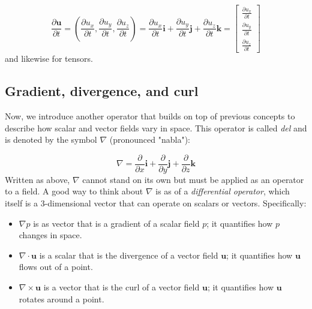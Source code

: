 \documentclass[12pt]{article}
\numberwithin{equation}{section}
\numberwithin{figure}{section}
\numberwithin{table}{section}
\begin{document}
\begin{equation}
  \frac{\partial \mathbf{u}}{\partial t}
    = \left(\frac{\partial u_x}{\partial t}, \frac{\partial u_y}{\partial t}, \frac{\partial u_z}{\partial t}\right)
    = \frac{\partial u_x}{\partial t} \mathbf{i} + \frac{\partial u_y}{\partial t} \mathbf{j} + \frac{\partial u_z}{\partial t} \mathbf{k}
    = \begin{bmatrix}
        \frac{\partial u_x}{\partial t} \\
        \frac{\partial u_y}{\partial t} \\
        \frac{\partial u_z}{\partial t}
      \end{bmatrix}
\end{equation}
and likewise for tensors.\\

\subsection{Gradient, divergence, and curl}

Now, we introduce another operator that builds on top of previous
concepts to describe how scalar and vector fields vary in space.
This operator is called \textit{del} and is denoted by the symbol
$\nabla$ (pronounced "nabla"):

\begin{equation}
  \nabla = \frac{\partial}{\partial x} \mathbf{i} +
    \frac{\partial}{\partial y} \mathbf{j} +
    \frac{\partial}{\partial z} \mathbf{k}
  \label{eq:nabla}
\end{equation}
Written as above, $\nabla$ cannot stand on its own but must be applied as an
operator to a field.
A good way to think about $\nabla$ is as of a \textit{differential operator},
which itself is a 3-dimensional vector that can operate on scalars or vectors.
Specifically:

\begin{itemize}
  \item $\nabla p$ is as vector that is a gradient of a scalar field $p$;
  it quantifies how $p$ changes in space.
  \item $\nabla \cdot \mathbf{u}$ is a scalar that is the divergence of a vector
  field $\mathbf{u}$; it quantifies how $\mathbf{u}$ flows out of a point.
  \item $\nabla \times \mathbf{u}$ is a vector that is the curl of a vector field
  $\mathbf{u}$; it quantifies how $\mathbf{u}$ rotates around a point.
\end{itemize}
\end{document}
